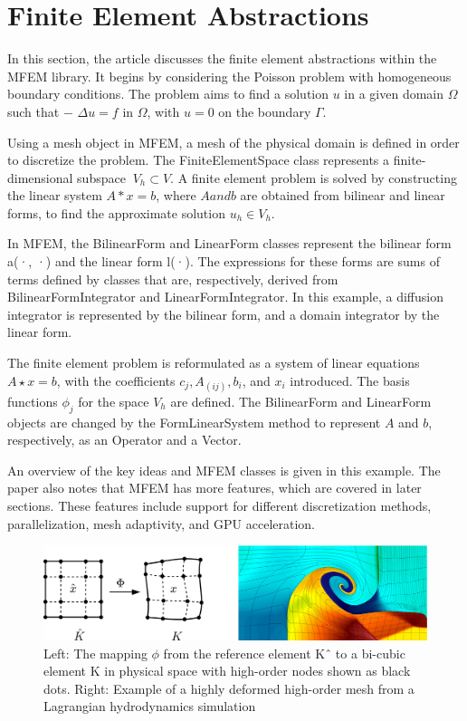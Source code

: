 \documentclass{article}
\begin{document}
\section{Finite Element Abstractions}

In this section, the article discusses the finite element abstractions within the MFEM library. It begins by considering the Poisson problem with homogeneous boundary conditions. The problem aims to find a solution $u$ in a given domain $\Omega$ such that $-$ $\Delta u = f $ in $\Omega$, with $u = 0$ on the boundary $\Gamma$.

Using a mesh object in MFEM, a mesh of the physical domain is defined in order to discretize the problem. The FiniteElementSpace class represents a finite-dimensional subspace $\ V_h \subset V$. A finite element problem is solved by constructing the linear system $ A \ast x = b$, where $A and b$ are obtained from bilinear and linear forms, to find the approximate solution $u_h \in V_h$.

In MFEM, the BilinearForm and LinearForm classes represent the bilinear form a(·, ·) and the linear form l(·). The expressions for these forms are sums of terms defined by classes that are, respectively, derived from BilinearFormIntegrator and LinearFormIntegrator. In this example, a diffusion integrator is represented by the bilinear form, and a domain integrator by the linear form.

The finite element problem is reformulated as a system of linear equations $ A \star x = b$, with the coefficients $c_j, A_(ij), b_i$, and $x_i$ introduced. The basis functions $\phi_j$ for the space $V_h$ are defined. The BilinearForm and LinearForm objects are changed by the FormLinearSystem method to represent $A$ and $b$, respectively, as an Operator and a Vector.

An overview of the key ideas and MFEM classes is given in this example. The paper also notes that MFEM has more features, which are covered in later sections. These features include support for different discretization methods, parallelization, mesh adaptivity, and GPU acceleration.

\begin{figure}
\centering
\includegraphics[width=1\linewidth]{image_1.jpg}
\caption{\label{fig:image_1} Left: The mapping $\phi$ from the reference element Kˆ to a bi-cubic element K in physical space with high-order nodes shown as black dots.
Right: Example of a highly deformed high-order mesh from a Lagrangian hydrodynamics simulation}
\end{figure}
\end{document}
